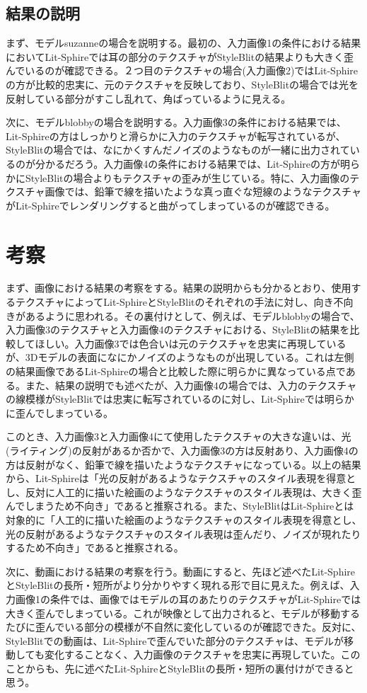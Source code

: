 \documentclass[dvipdfmx]{jsarticle}
\begin{document}
\subsection{結果の説明}
まず、モデルsuzanneの場合を説明する。最初の、入力画像1の条件における結果においてLit-Sphireでは耳の部分のテクスチャがStyleBlitの結果よりも大きく歪んでいるのが確認できる。２つ目のテクスチャの場合(入力画像2)ではLit-Sphireの方が比較的忠実に、元のテクスチャを反映しており、StyleBlitの場合では光を反射している部分がすこし乱れて、角ばっているように見える。\par
次に、モデルblobbyの場合を説明する。入力画像3の条件における結果では、Lit-Sphireの方はしっかりと滑らかに入力のテクスチャが転写されているが、StyleBlitの場合では、なにかくすんだノイズのようなものが一緒に出力されているのが分かるだろう。入力画像4の条件における結果では、Lit-Sphireの方が明らかにStyleBlitの場合よりもテクスチャの歪みが生じている。特に、入力画像のテクスチャ画像では、鉛筆で線を描いたような真っ直ぐな短線のようなテクスチャがLit-Sphireでレンダリングすると曲がってしまっているのが確認できる。
\section{考察}
まず、画像における結果の考察をする。結果の説明からも分かるとおり、使用するテクスチャによってLit-SphireとStyleBlitのそれぞれの手法に対し、向き不向きがあるように思われる。その裏付けとして、例えば、モデルblobbyの場合で、入力画像3のテクスチャと入力画像4のテクスチャにおける、StyleBlitの結果を比較してほしい。入力画像3では色合いは元のテクスチャを忠実に再現しているが、3Dモデルの表面になにかノイズのようなものが出現している。これは左側の結果画像であるLit-Sphireの場合と比較した際に明らかに異なっている点である。また、結果の説明でも述べたが、入力画像4の場合では、入力のテクスチャの線模様がStyleBlitでは忠実に転写されているのに対し、Lit-Sphireでは明らかに歪んでしまっている。\par
このとき、入力画像3と入力画像4にて使用したテクスチャの大きな違いは、光(ライティング)の反射があるか否かで、入力画像3の方は反射あり、入力画像4の方は反射がなく、鉛筆で線を描いたようなテクスチャになっている。以上の結果から、Lit-Sphireは「光の反射があるようなテクスチャのスタイル表現を得意とし、反対に人工的に描いた絵画のようなテクスチャのスタイル表現は、大きく歪んでしまうため不向き」であると推察される。また、StyleBlitはLit-Sphireとは対象的に「人工的に描いた絵画のようなテクスチャのスタイル表現を得意とし、光の反射があるようなテクスチャのスタイル表現は歪んだり、ノイズが現れたりするため不向き」であると推察される。\par
次に、動画における結果の考察を行う。動画にすると、先ほど述べたLit-SphireとStyleBlitの長所・短所がより分かりやすく現れる形で目に見えた。例えば、入力画像1の条件では、画像ではモデルの耳のあたりのテクスチャがLit-Sphireでは大きく歪んでしまっている。これが映像として出力されると、モデルが移動するたびに歪んでいる部分の模様が不自然に変化しているのが確認できた。反対に、StyleBlitでの動画は、Lit-Sphireで歪んでいた部分のテクスチャは、モデルが移動しても変化することなく、入力画像のテクスチャを忠実に再現していた。このことからも、先に述べたLit-SphireとStyleBlitの長所・短所の裏付けができると思う。
\end{document}
